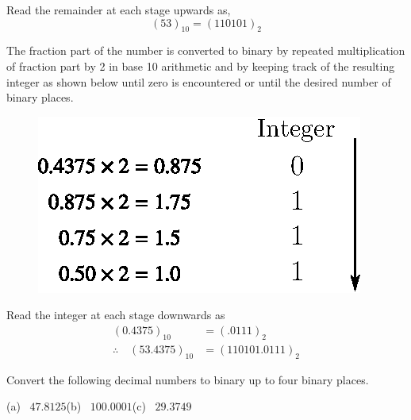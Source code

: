 Read the remainder at each stage upwards as,
$$
(53)_{10}=(110101)_{2}
$$

The fraction part of the number is converted to binary by repeated multiplication of fraction part by 2 in base 10 arithmetic and by keeping track of the resulting integer as shown below until zero is encountered or until the desired number of binary places.
\begin{figure}[H]
\centering
\includegraphics{chap6/fig2.eps}
\end{figure}

Read the integer at each stage downwards as
\begin{align*}
(0.4375)_{10} &= (.0111)_{2}\\[3pt]
\therefore\quad (53.4375)_{10} &= (110101.0111)_{2}
\end{align*}

\begin{example}\label{exam6.4}
Convert the following decimal numbers to binary up to four binary places.
\begin{center}
(a)~ $47.8125$\qquad (b)~ $100.0001$\qquad (c)~ $29.3749$
\end{center}
\end{example}

\eject

